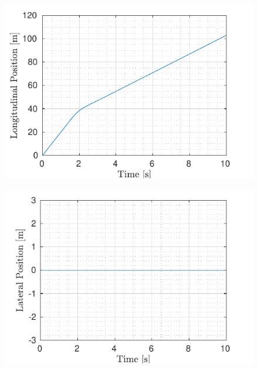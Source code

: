 \begin{figure}[!t] %
	\begin{minipage}[t]{0.5\textwidth}
		\includegraphics[width=\textwidth]{../../MATLAB/no_overtaking/figure/LongitudinalPositionVsTime.pdf}
		\subcaption{}\label{fig:longitudinal_no_overtaking}
	\end{minipage}
	\begin{minipage}[t]{0.5\textwidth}
		\includegraphics[width=\textwidth]{../../MATLAB/no_overtaking/figure/LateralPositionVsTime.pdf}
		\subcaption{}\label{fig:lateral_no_overtaking}
	\end{minipage}
	\begin{minipage}[t]{0.5\textwidth}

\end{minipage}
\end{figure}
